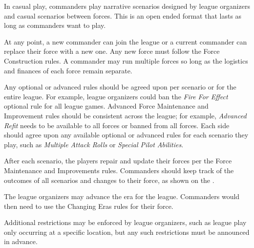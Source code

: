 In casual play, commanders play narrative scenarios designed by league organizers and casual scenarios between forces.
This is an open ended format that lasts as long as commanders want to play.

At any point, a new commander can join the league or a current commander can replace their force with a new one.
Any new force must follow the Force Construction rules.
A commander may run multiple forces so long as the logistics and finances of each force remain separate.

Any optional or advanced rules should be agreed upon per scenario or for the entire league.
For example, league organizers could ban the \emph{Fire For Effect} optional rule for all league games.
Advanced Force Maintenance and Improvement rules should be consistent across the league; for example, \emph{Advanced Refit} needs to be available to all forces or banned from all forces.
Each side should agree upon any available optional or advanced rules for each scenario they play, such as \emph{Multiple Attack Rolls} or \emph{Special Pilot Abilities}.

After each scenario, the players repair and update their forces per the Force Maintenance and Improvements rules.
Commanders should keep track of the outcomes of all scenarios and changes to their force, as shown on the .

The league organizers may advance the era for the league.
Commanders would then need to use the Changing Eras rules for their force.

Additional restrictions may be enforced by league organizers, such as league play only occurring at a specific location, but any such restrictions must be announced in advance.
